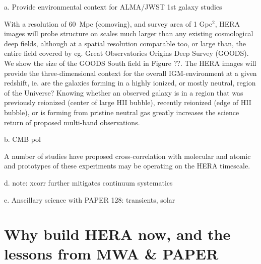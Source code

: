 \documentclass[preprint]{aastex}
\begin{document}




a. Provide environmental context for ALMA/JWST 1st galaxy studies

With a resolution of 60~Mpc (comoving), and survey area of 1 Gpc$^2$, HERA images will probe structure on scales 
much larger than  any existing cosmological deep fields, although at a spatial resolution comparable too, or large than,
the entire field covered by eg. Great Observatories Origins Deep 
Survey (GOODS). We show the size of the GOODS South field in Figure ??. The HERA images will provide
the three-dimensional context for the overall IGM-environment at a given redshift, ie. are the galaxies
forming in a highly ionized, or mostly neutral, region of the Universe?
Knowing whether an observed galaxy is in a region that was previously reionized (center of large HII 
bubble), recently reionized (edge of HII bubble), or is forming from pristine neutral gas greatly increases 
the science return of proposed multi-band observations. 


b. CMB pol 

A number of studies have proposed cross-correlation with molecular \cite{lidz_et_al2011} and atomic \citep{gong_et_al2011} and prototypes of these experiments may be operating on the HERA timescale.


  
d. note: xcorr further mitigates continuum systematics

e. Anscillary science with PAPER 128: transients, solar 


\section{Why build HERA now, and the lessons from MWA \& PAPER}
\end{document}
